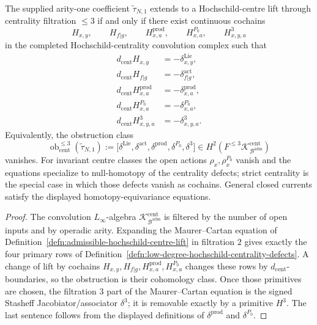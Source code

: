 \documentclass[11pt]{memoir}
\begin{document}
\begin{prop}
\label{prop:low-degree-centre-lift-obstruction}
  The supplied arity-one coefficient \(\widetilde\tau_{N,1}\) extends to a
  Hochschild-centre lift through centrality filtration \(\leq3\) if and
  only if there exist continuous cochains
  \[
    H_{x,y},\qquad H_{f|g},\qquad
    H^{\mathrm{prod}}_{x,a},\qquad
    H^{P_0}_{x,a},\qquad H^3_{x,y,a}
  \]
  in the completed Hochschild-centrality convolution complex such that
  \[
    \begin{aligned}
      d_{\mathrm{cent}}H_{x,y}&=-\delta^{\mathrm{Lie}}_{x,y},\\
      d_{\mathrm{cent}}H_{f|g}&=-\delta^{\mathrm{act}}_{f|g},\\
      d_{\mathrm{cent}}H^{\mathrm{prod}}_{x,a}
        &=-\delta^{\mathrm{prod}}_{x,a},\\
      d_{\mathrm{cent}}H^{P_0}_{x,a}
        &=-\delta^{P_0}_{x,a},\\
      d_{\mathrm{cent}}H^3_{x,y,a}&=-\delta^3_{x,y,a}.
    \end{aligned}
  \]
  Equivalently, the obstruction class
  \[
    \operatorname{ob}^{\leq3}_{\mathrm{cent}}(\widetilde\tau_{N,1})
      :=
      \bigl[
        \delta^{\mathrm{Lie}},
        \delta^{\mathrm{act}},
        \delta^{\mathrm{prod}},
        \delta^{P_0},
        \delta^3
      \bigr]
      \in
      H^2\!\left(
        F^{\leq3}\mathcal K^{\mathrm{cent}}_{\mathcal B^{\mathrm{adm}}}
      \right)
  \]
  vanishes.  For invariant centre classes the open actions
  \(\rho_x,\rho_x^{P_0}\) vanish and the equations specialize to
  null-homotopy of the centrality defects; strict centrality is the
  special case in which those defects vanish as cochains.  General
  closed currents satisfy the displayed homotopy-equivariance
  equations.
\end{prop}

\begin{proof}
  The convolution \(L_\infty\)-algebra
  \(\mathcal K^{\mathrm{cent}}_{\mathcal B^{\mathrm{adm}}}\) is
  filtered by the number of open inputs and by operadic arity.  Expanding
  the Maurer--Cartan equation of
  Definition~\ref{defn:admissible-hochschild-centre-lift} in filtration
  \(2\) gives exactly the four primary rows of
  Definition~\ref{defn:low-degree-hochschild-centrality-defects}.  A
  change of lift by cochains \(H_{x,y},H_{f|g},
  H^{\mathrm{prod}}_{x,a},H^{P_0}_{x,a}\) changes these rows by
  \(d_{\mathrm{cent}}\)-boundaries, so the obstruction is their
  cohomology class.  Once those primitives are chosen, the filtration
  \(3\) part of the Maurer--Cartan equation is the signed Stasheff
  Jacobiator/associator \(\delta^3\); it is removable exactly by a
  primitive \(H^3\).  The last sentence follows from the displayed
  definitions of \(\delta^{\mathrm{prod}}\) and \(\delta^{P_0}\).
\end{proof}
\end{document}
